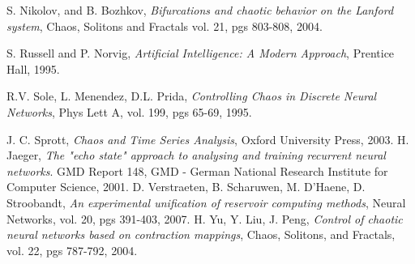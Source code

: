 \documentclass[12pt]{article}
\begin{document}
\begin{thebibliography}{widest-label}
 S. Nikolov, and B. Bozhkov,
 \emph{Bifurcations and chaotic behavior on the Lanford system},
 Chaos, Solitons and Fractals
 vol. 21,
 pgs 803-808,
 2004.

 S. Russell and P. Norvig,
 \emph{Artificial Intelligence: A Modern Approach},
 Prentice Hall,
 1995.

 R.V. Sole, L. Menendez, D.L. Prida,
 \emph{Controlling Chaos in Discrete Neural Networks},
 Phys Lett A,
 vol. 199,
 pgs 65-69,
 1995.

 J. C. Sprott,
 \emph{Chaos and Time Series Analysis},
 Oxford University Press,
 2003.
  H. Jaeger,
  \emph{The "echo state" approach to analysing and training recurrent neural networks}.
  GMD Report 148, 
  GMD - German National Research Institute for Computer Science,
  2001.
 D. Verstraeten, B. Scharuwen, M. D'Haene, D. Stroobandt,
 \emph{An experimental unification of reservoir computing methods},
 Neural Networks,
 vol. 20,
 pgs 391-403,
 2007.
 H. Yu, Y. Liu, J. Peng,
 \emph{Control of chaotic neural networks based on contraction mappings},
 Chaos, Solitons, and Fractals,
 vol. 22,
 pgs 787-792,
 2004.

\end{thebibliography}
\newpage
\end{document}
